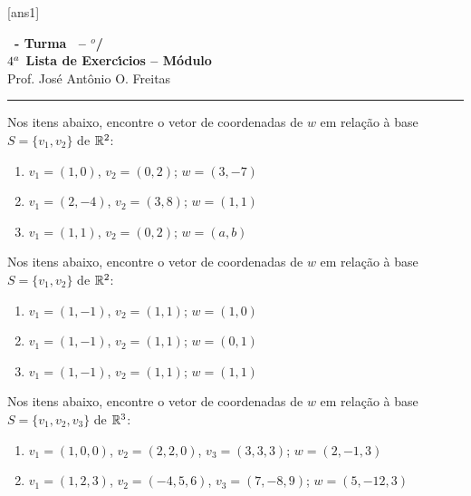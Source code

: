 \documentclass[12pt]{exam}
\begin{document}
    [ans1]
    
    \begin{center}
        {\Large\bf \disciplina\ - Turma \turma\ -- \semestre$^{o}$/\ano} \\ \vspace{9pt} {\large\bf
            $4^a$ Lista de Exerc{\'\i}cios -- Módulo \numeromodulo}\\ \vspace{9pt} Prof. Jos{\'e} Ant{\^o}nio O. Freitas
    \end{center}
    
    \hrule

    \begin{exercicio}
        Nos itens abaixo, encontre o vetor de coordenadas de $w$ em relação à base  $S = \{v_1, v_2\}$ de $\mathbb{R}^2$:
        \begin{enumerate}
            \item $v_1 = (1, 0)$, $v_2 = (0, 2)$; $w = (3, -7)$
            \item $v_1 = (2, -4)$, $v_2 = (3, 8)$; $w = (1, 1)$
            \item $v_1 = (1, 1)$, $v_2 = (0, 2)$; $w = (a, b)$
        \end{enumerate}
    \end{exercicio}

    \begin{exercicio}
        Nos itens abaixo, encontre o vetor de coordenadas de $w$ em relação à base $S = \{v_1, v_2\}$ de $\mathbb{R}^2$:
        \begin{enumerate}
            \item $v_1 = (1, -1)$, $v_2 = (1, 1)$; $w = (1, 0)$
            \item $v_1 = (1, -1)$, $v_2 = (1, 1)$; $w = (0, 1)$
            \item $v_1 = (1, -1)$, $v_2 = (1, 1)$; $w = (1, 1)$
        \end{enumerate}
    \end{exercicio}

    \begin{exercicio}
        Nos itens abaixo, encontre o vetor de coordenadas de $w$ em relação à base $S = \{v_1, v_2, v_3\}$ de $\mathbb{R}^3$:
        \begin{enumerate}
            \item $v_1 = (1, 0, 0)$, $v_2 = (2, 2, 0)$, $v_3 = (3, 3, 3)$; $w = (2, -1, 3)$
            \item $v_1 = (1, 2, 3)$, $v_2 = (-4, 5, 6)$, $v_3 = (7, -8, 9)$; $w = (5, -12, 3)$
        \end{enumerate}
    \end{exercicio}
\end{document}

